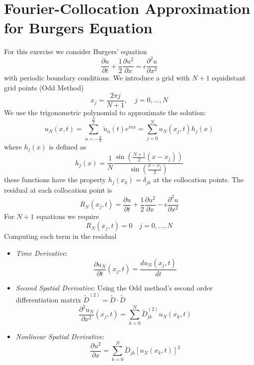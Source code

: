 \section{Fourier-Collocation Approximation for Burgers Equation}
For this exercise we consider Burgers' equation
\begin{equation}
	\frac{\partial u}{\partial t} + \frac{1}{2} \frac{\partial u^2}{\partial x} = \epsilon \frac{\partial^2 u}{\partial x^2}
	\label{eq:burger}
\end{equation}
with periodic boundary conditions.\newline
We introduce a grid with $N+1$ equidistant grid points (Odd Method)
\begin{equation}
	x_j = \frac{2 \pi j}{N+1}, \quad j=0, \dots, N
	\label{eq:gridpts}
\end{equation}
We use the trigonometric polynomial to approximate the solution:
\begin{equation}
	u_N(x,t) = \sum_{n=-\frac{N}{2}}^{\frac{N}{2}} \tilde{u}_n(t)e^{inx} = \sum_{j=0}^N u_N(x_j,t) h_j(x)
	\label{eq:trigo}
\end{equation}
where $h_j(x)$ is defined as
\begin{equation}
	h_j(x) = \frac{1}{N} \frac{\sin\left(\frac{N+1}{2} (x - x_j) \right)}{\sin \left(\frac{x-x_j}{2} \right)}
	\label{eq:card}
\end{equation}
these functions have the property $h_j(x_k) = \delta_{jk}$ at the collocation points.\newline
The residual at each collocation point is
\begin{equation}
	R_N(x_j, t) = 	\frac{\partial u}{\partial t} + \frac{1}{2} \frac{\partial u^2}{\partial x} - \epsilon \frac{\partial^2 u}{\partial x^2}
	\label{eq:col_res}
\end{equation}
For $N+1$ equations we require
\begin{equation}
	R_N(x_j, t ) = 0  \quad j = 0, \dots, N
	\label{eq:res_req}
\end{equation}
Computing each term in the residual
\begin{itemize}
	\item \textit{Time Derivative}:
	      \begin{equation}
		      \frac{\partial u_N}{\partial t}(x_j, t) = \frac{du_N (x_j,t)}{dt}
		      \label{eq:tim_der4}
	      \end{equation}
	\item \textit{Second Spatial Derivative}: Using the Odd method's second order differentiation matrix $\tilde{D}^{(2)} = \tilde{D} \cdot \tilde{D}$
	      \begin{equation}
		      \frac{\partial^2 u_N}{\partial x^2}(x_j, t) = \sum_{k=0}^N \tilde{D}^{(2)}_{jk} u_N (x_k, t)
		      \label{eq:sec_spat_der}
	      \end{equation}
	\item \textit{Nonlinear Spatial Derivative}:
	      \begin{equation}
			  \frac{\partial u^2}{\partial x}  = \sum_{k=0}^N \tilde{D}_{jk} \left [ u_N (x_k, t)\right]^2
		      \label{eq:nonlin_sec_spat_der}
	      \end{equation}
\end{itemize}
